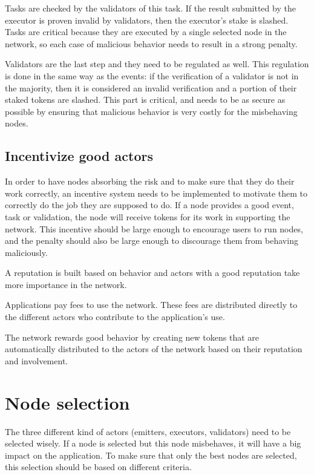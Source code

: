 \documentclass{article}
\begin{document}
Tasks are checked by the validators of this task. If the result submitted by the executor is proven invalid by validators, then the executor’s stake is slashed. Tasks are critical because they are executed by a single selected node in the network, so each case of malicious behavior needs to result in a strong penalty.

Validators are the last step and they need to be regulated as well. This regulation is done in the same way as the events: if the verification of a validator is not in the majority, then it is considered an invalid verification and a portion of their staked tokens are slashed. This part is critical, and needs to be as secure as possible by ensuring that malicious behavior is very costly for the misbehaving nodes.

\subsection{Incentivize good actors}

In order to have nodes absorbing the risk and to make sure that they do their work correctly, an incentive system needs to be implemented to motivate them to correctly do the job they are supposed to do. If a node provides a good event, task or validation, the node will receive tokens for its work in supporting the network. This incentive should be large enough to encourage users to run nodes, and the penalty should also be large enough to discourage them from behaving maliciously. 

A reputation is built based on behavior and actors with a good reputation take more importance in the network.

Applications pay fees to use the network. These fees are distributed directly to the different actors who contribute to the application’s use.

The network rewards good behavior by creating new tokens that are automatically distributed to the actors of the network based on their reputation and involvement.

\section{Node selection}

The three different kind of actors (emitters, executors, validators) need to be selected wisely. If a node is selected but this node misbehaves, it will have a big impact on the application. To make sure that only the best nodes are selected, this selection should be based on different criteria.
\end{document}
